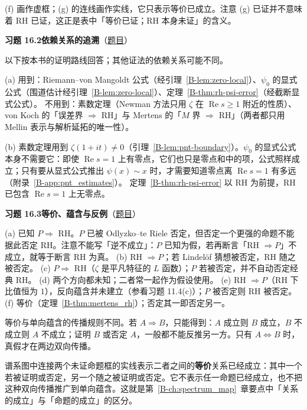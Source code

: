 \documentclass[11pt,a4paper]{article}
\renewcommand{\Re}{\operatorname{Re}}
\newcommand{\bref}[1]{\ref*{B-#1}}
\newcommand{\Sol}[2]{%
  \par\addvspace{1.2em}\noindent
  \hypertarget{s:#1}{}\textbf{习题 #1\quad #2}\hfill{\small（\hyperlink{q:#1}{题目}）}\par
  \nopagebreak\smallskip}
\begin{document}
(f) 画作虚框；(g) 的连线画作实线，它只表示等价已成立。注意 (g) 已证并不意味着 RH 已证，这正是表中「等价已证；RH 本身未证」的含义。

\Sol{16.2}{依赖关系的追溯}
以下按本书的证明路线回答；其他证法的依赖关系可能不同。

(a) 用到：Riemann--von Mangoldt 公式（经引理~\bref{lem:zero-local}）、$\psi_0$ 的显式公式（围道估计经引理~\bref{lem:zero-local}）、定理~\bref{thm:rh-psi-error}（经截断显式公式）。
不用到：素数定理（Newman 方法只用 $\zeta$ 在 $\Re s\ge1$ 附近的性质）、von Koch 的「误差界 $\Rightarrow$ RH」与 Mertens 的「$M$ 界 $\Rightarrow$ RH」（两者都只用 Mellin 表示与解析延拓的唯一性）。

(b) 素数定理用到 $\zeta(1+it)\neq0$（引理~\bref{lem:pnt-boundary}）。$\psi_0$ 的显式公式本身不需要它：即使 $\Re s=1$ 上有零点，它们也只是零点和中的项，公式照样成立；只有要从显式公式推出 $\psi(x)\sim x$ 时，才需要知道零点离 $\Re s=1$ 有多远（附录~\bref{app:pnt_estimates}）。
定理~\bref{thm:rh-psi-error} 以 RH 为前提，RH 已包含 $\Re s=1$ 上无零点。

\Sol{16.3}{等价、蕴含与反例}
(a) 已知 $P\Rightarrow$ RH。$P$ 已被 Odlyzko--te Riele 否定，但否定一个更强的命题不能据此否定 RH。注意不能写「逆不成立」：$P$ 已知为假，若再断言「RH $\Rightarrow P$」不成立，就等于断言 RH 为真。
(b) RH $\Rightarrow P$；若 Lindelöf 猜想被否定，RH 随之被否定。
(c) $P\Rightarrow$ RH（$\zeta$ 是平凡特征的 $L$ 函数）；$P$ 若被否定，并不自动否定经典 RH。
(d) 两个方向都未知；二者常一起作为假设使用。
(e) RH $\Rightarrow P$（RH 下比值恒为 $1$），反向蕴含并未建立（参看习题 11.4(c)）；$P$ 被否定则 RH 被否定。
(f) 等价（定理~\bref{thm:mertens_rh}）；否定其一即否定另一。

等价与单向蕴含的传播规则不同。若 $A\Rightarrow B$，只能得到：$A$ 成立则 $B$ 成立，$B$ 不成立则 $A$ 不成立；证明 $B$ 或否定 $A$，一般都不能反推另一方。只有 $A\Leftrightarrow B$ 时，真假才在两边双向传播。

谱系图中连接两个未证命题框的实线表示二者之间的\textbf{等价}关系已经成立：其中一个若被证明或否定，另一个随之被证明或否定。它不表示任一命题已经成立，也不把这种双向传播推广到单向蕴含。这就是第~\bref{ch:spectrum_map}~章要点中「关系的成立」与「命题的成立」的区分。
\end{document}
